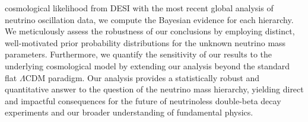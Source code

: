 \documentclass[]{article}
\begin{document}
cosmological likelihood from DESI with the most recent global analysis of neutrino oscillation data, we compute the Bayesian evidence for each hierarchy. We meticulously assess the robustness of our conclusions by employing distinct, well-motivated prior probability distributions for the unknown neutrino mass parameters. Furthermore, we quantify the sensitivity of our results to the underlying cosmological model by extending our analysis beyond the standard flat $\Lambda$CDM paradigm. Our analysis provides a statistically robust and quantitative answer to the question of the neutrino mass hierarchy, yielding direct and impactful consequences for the future of neutrinoless double-beta decay experiments and our broader understanding of fundamental physics.
\end{document}
